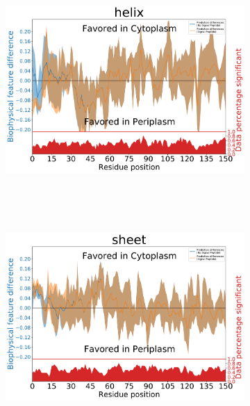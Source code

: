 ~\begin{figure}[h!]
	~\begin{subfigure}[b]{\linewidth}
			\includegraphics[width=\linewidth, height=0.43\textheight, keepaspectratio]
	{./results/twins/img/helix.pdf}
		\caption{}
		\label{fig:twin_helix}
	~\end{subfigure}
	\newline
	~\begin{subfigure}[b]{\linewidth}
			\includegraphics[width=\linewidth, height=0.43\textheight, keepaspectratio]
	{./results/twins/img/sheet.pdf}
		\caption{}
		\label{fig:twin_sheet}
	~\end{subfigure}
~\end{figure}


